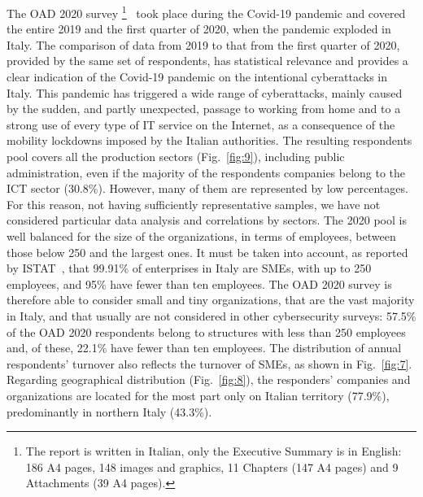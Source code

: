 \documentclass{easychair}
\begin{document}
The OAD 2020 survey
\footnote{The report is written in Italian,
  only the Executive Summary is in English: 186 A4 pages, 148 images and graphics, 11 Chapters
  (147 A4 pages) and 9 Attachments (39 A4 pages).}~\cite{oad20}
took place during the
Covid-19 pandemic and covered the entire 2019 and the first quarter
of 2020, when the pandemic exploded in Italy. The comparison of data from 2019 to that
from the first quarter of 2020, provided by the same set of respondents,
has statistical relevance and provides a 
clear indication of the Covid-19 pandemic on the intentional cyberattacks in Italy.
This pandemic has triggered a wide range of cyberattacks, mainly 
caused by the sudden, and partly unexpected, passage to working from home
and to a strong use of every type of IT service on the Internet, as a consequence
of the mobility lockdowns imposed by the Italian authorities. The resulting respondents pool
covers all the production sectors (Fig.~\ref{fig:9}), including public administration,
even if the majority of the respondents companies belong to the ICT sector (30.8\%).
However, many of them are represented by low percentages. For this reason, not having sufficiently
representative samples, we have not considered particular data analysis and correlations by sectors.
The 2020 pool is well balanced for the size of the organizations, in terms
of employees, between those below 250 and the largest ones. It must be taken into account,
as reported by ISTAT~\cite{istat21}, that 99.91\%
of enterprises in Italy are SMEs, with up to 250 employees, and 95\% have fewer than ten employees.
The OAD 2020 survey is therefore able to consider small and 
tiny organizations, that are the vast majority in Italy, and that usually
are not considered in other cybersecurity surveys: 57.5\% of the OAD 2020 respondents
belong to structures with less than 250 employees and, of these, 22.1\% have fewer than ten
employees. The distribution of annual respondents' turnover also reflects the turnover of SMEs, as shown in Fig.~\ref{fig:7}. Regarding geographical distribution (Fig.~\ref{fig:8}), the responders' companies and organizations are located for the most part only on Italian territory (77.9\%), predominantly in northern Italy (43.3\%).
\end{document}
